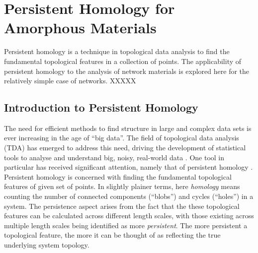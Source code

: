 \chapter[Persistent Homology for Amorphous Materials]{Persistent Homology for \\ Amorphous Materials}
\label{ch:ph}

\begin{chapterabstract}
Persistent homology is a technique in topological data analysis to find the fundamental topological features in a collection of points.
The applicability of persistent homology to the analysis of network materials is explored here for the relatively simple case of \td{} networks. 
XXXXX
\end{chapterabstract}

\section{Introduction to Persistent Homology}

The need for efficient methods to find structure in large and complex data sets is ever increasing in the age of ``big data''.
The field of topological data analysis (TDA) has emerged to address this need, driving the development of statistical tools to analyse and understand big, noisy, real\--world data \cite{Wasserman2018}.
One tool in particular has received significant attention, namely that of persistent homology \cite{Edelsbrunner2008}.
Persistent homology is concerned with finding the fundamental topological features of given set of points. 
In slightly plainer terms, here \textit{homology} means counting the number of connected components (``blobs'') and cycles (``holes'') in a system.
The persistence aspect arises from the fact that the these topological features can be calculated across different length scales, with those existing across multiple length scales being identified as more \textit{persistent}.
The more persistent a topological feature, the more it can be thought of as reflecting the true underlying system topology.

